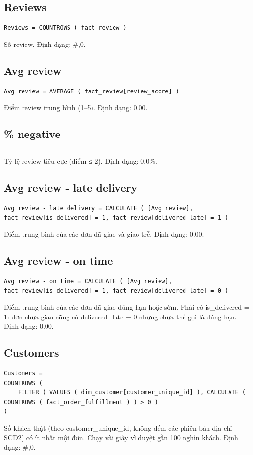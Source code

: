 \subsection*{Reviews}
\begin{lstlisting}[language={}]
Reviews = COUNTROWS ( fact_review )
\end{lstlisting}
Số review. Định dạng: \#,0.

\subsection*{Avg review}
\begin{lstlisting}[language={}]
Avg review = AVERAGE ( fact_review[review_score] )
\end{lstlisting}
Điểm review trung bình (1–5). Định dạng: 0.00.

\subsection*{\% negative}
\begin{lstlisting}[language={}]
% negative = DIVIDE ( SUM ( fact_review[is_negative] ), [Reviews] )
\end{lstlisting}
Tỷ lệ review tiêu cực (điểm ≤ 2). Định dạng: 0.0\%.

\subsection*{Avg review - late delivery}
\begin{lstlisting}[language={}]
Avg review - late delivery = CALCULATE ( [Avg review], fact_review[is_delivered] = 1, fact_review[delivered_late] = 1 )
\end{lstlisting}
Điểm trung bình của các đơn đã giao và giao trễ. Định dạng: 0.00.

\subsection*{Avg review - on time}
\begin{lstlisting}[language={}]
Avg review - on time = CALCULATE ( [Avg review], fact_review[is_delivered] = 1, fact_review[delivered_late] = 0 )
\end{lstlisting}
Điểm trung bình của các đơn đã giao đúng hạn hoặc sớm. Phải có is\_delivered = 1: đơn chưa giao cũng có delivered\_late = 0 nhưng chưa thể gọi là đúng hạn. Định dạng: 0.00.

\subsection*{Customers}
\begin{lstlisting}[language={}]
Customers =
COUNTROWS (
    FILTER ( VALUES ( dim_customer[customer_unique_id] ), CALCULATE ( COUNTROWS ( fact_order_fulfillment ) ) > 0 )
)
\end{lstlisting}
Số khách thật (theo customer\_unique\_id, không đếm các phiên bản địa chỉ SCD2) có ít nhất một đơn. Chạy vài giây vì duyệt gần 100 nghìn khách. Định dạng: \#,0.


